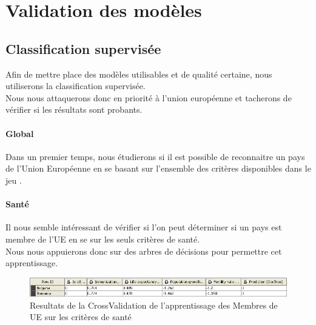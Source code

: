 \section{Validation des modèles}


\subsection{Classification supervisée}
Afin de mettre place des modèles utilisables et de qualité certaine, nous utiliserons la classification supervisée.\\
Nous nous attaquerons donc en priorité à l'union européenne et tacherons de vérifier si les résultats sont probants.

\paragraph{Global}
Dans un premier temps, nous étudierons si il est possible de reconnaitre un pays de l'Union Européenne en se basant sur l'ensemble des critères disponibles dans le jeu \jeuc .

\paragraph{Santé}
Il nous semble intéressant de vérifier si l'on peut déterminer si un pays est membre de l'UE en se sur les seuls critères de santé.\\
Nous nous appuierons donc sur des arbres de décisions pour permettre cet apprentissage.
\begin{figure}[H]
	\begin{center}
		\includegraphics[scale=0.5]{Image/DecisionTreeSanteBlugarieRoumanie}
		\caption{Resultats de la CrossValidation de l'apprentissage des Membres de UE sur les critères de santé}
	\end{center}
\end{figure}


